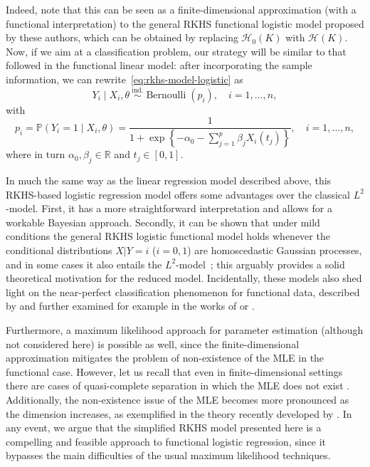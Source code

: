 \documentclass{article}
\numberwithin{equation}{section}
\theoremstyle{plain}
\theoremstyle{definition}
\newcommand{\R}{\mathbb{R}}
\newcommand{\Hcal}{\mathcal{H}}
\begin{document}
Indeed, note that this can be seen as a finite-dimensional approximation (with a functional interpretation) to the general RKHS functional logistic model proposed by these authors, which can be obtained by replacing \(\Hcal_{0}(K)\) with \(\Hcal(K)\). Now, if we aim at a classification problem, our strategy will be similar to that followed in the functional linear model: after incorporating the sample information, we can rewrite~\eqref{eq:rkhs-model-logistic} as
\begin{equation}\label{eq:rkhs-model-logistic-2}
  Y_i \mid X_i,\theta \ \stackrel{\text{ind.}}{\sim} \operatorname{Bernoulli}(p_i), \quad i=1,\dots, n,
\end{equation}
with
\begin{equation*}\label{eq:rkhs-model-logistic-2-parameter}
  p_i = \mathbb P(Y_i=1 \mid X_i,\theta) = \frac{1}{\displaystyle 1 + \exp\left\{-\alpha_0 - \sum_{j=1}^p \beta_j X_i(t_j)\right\}}, \quad i=1,\dots, n,
\end{equation*}
where in turn \(\alpha_0,\beta_j\in\R\) and \(t_j\in[0, 1]\).

In much the same way as the linear regression model described above, this RKHS-based logistic regression model offers some advantages over the classical \(L^2\)-model. First, it has a more straightforward interpretation and allows for a workable Bayesian approach. Secondly, it can be shown that under mild conditions the general RKHS logistic functional model holds whenever the conditional distributions \(X | Y=i\) (\(i=0,1\)) are homoscedastic Gaussian processes, and in some cases it also entails the \(L^2\)-model~\citep[see][]{berrendero2023functional}; this arguably provides a solid theoretical motivation for the reduced model. Incidentally, these models also shed light on the near-perfect classification phenomenon for functional data, described by \citet{delaigle2012achieving} and further examined for example in the works of \citet{berrendero2018use} or \citet{torrecilla2020optimal}.

Furthermore, a maximum likelihood approach for parameter estimation (although not considered here) is possible as well, since the finite-dimensional approximation  mitigates the problem of non-existence of the MLE in the functional case. However, let us recall that even in finite-dimensional settings there are cases of quasi-complete separation in which the MLE does not exist \citep{albert1984existence}. Additionally, the non-existence issue of the MLE becomes more pronounced as the dimension increases, as exemplified in the theory recently developed by \citet{candes2020phase}. In any event, we argue that the simplified RKHS model presented here is a compelling and feasible approach to functional logistic regression, since it bypasses the main difficulties of the usual maximum likelihood techniques.
\end{document}
